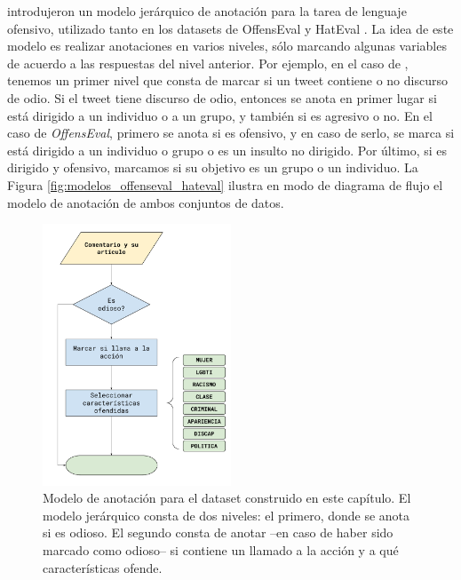 \citet{zampieri2019predicting} introdujeron un modelo jerárquico de anotación para la tarea de lenguaje ofensivo, utilizado tanto en los datasets de OffensEval \cite{zampieri2019semeval2019} y HatEval \cite{hateval2019semeval}. La idea de este modelo es realizar anotaciones en varios niveles, sólo marcando algunas variables de acuerdo a las respuestas del nivel anterior. Por ejemplo, en el caso de \hateval{}, tenemos un primer nivel que consta de marcar si un tweet contiene o no discurso de odio. Si el tweet tiene discurso de odio, entonces se anota en primer lugar si está dirigido a un individuo o a un grupo, y también si es agresivo o no. En el caso de \emph{OffensEval}, primero se anota si es ofensivo, y en caso de serlo, se marca si está dirigido a un individuo o grupo o es un insulto no dirigido. Por último, si es dirigido y ofensivo, marcamos si su objetivo es un grupo o un individuo. La Figura \ref{fig:modelos_offenseval_hateval} ilustra en modo de diagrama de flujo el modelo de anotación de ambos conjuntos de datos.


%
%
%



\begin{figure}[t]
    \centering
    \includegraphics[width=0.5\textwidth]{img/05/annotation_model.pdf}
    \caption{Modelo de anotación para el dataset construido en este capítulo. El modelo jerárquico consta de dos niveles: el primero, donde se anota si es odioso. El segundo consta de anotar --en caso de haber sido marcado como odioso-- si contiene un llamado a la acción y a qué características ofende.}
    \label{fig:annotation_model}
\end{figure}


